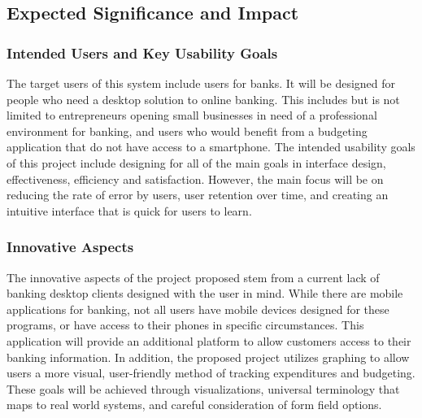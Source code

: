 \newpage

\subsection{Expected Significance and Impact}
\label{sect:significance_and_impact}

\subsubsection{Intended Users and Key Usability Goals}
\label{sect:key_usability_goals}
The target users of this system include users for banks. It will be designed for people who need a desktop solution to online banking. This includes but is not limited to entrepreneurs opening small businesses in need of a professional environment for banking, and users who would benefit from a budgeting application that do not have access to a smartphone.
The intended usability goals of this project include designing for all of the main goals in interface design, effectiveness, efficiency and satisfaction. However, the main focus will be on reducing the rate of error by users, user retention over time, and creating an intuitive interface that is quick for users to learn.


\subsubsection{Innovative Aspects}
\label{sect:innovative_aspects}
The innovative aspects of the project proposed stem from a current lack of banking desktop clients designed with the user in mind. While there are mobile applications for banking, not all users have mobile devices designed for these programs, or have access to their phones in specific circumstances. This application will provide an additional platform to allow customers access to their banking information. In addition, the proposed project utilizes graphing to allow users a more visual, user-friendly method of tracking expenditures and budgeting. These goals will be achieved through visualizations, universal terminology that maps to real world systems, and careful consideration of form field options.


